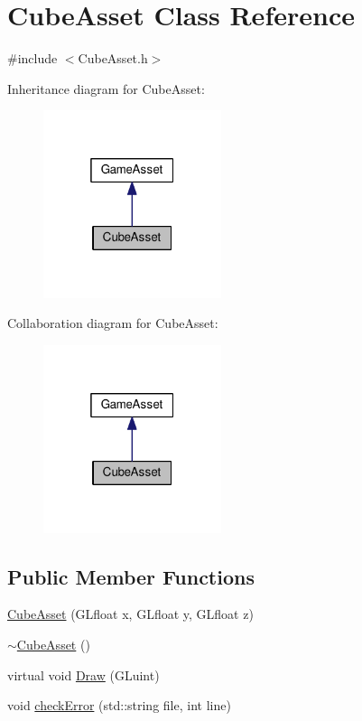 \hypertarget{classCubeAsset}{}\section{Cube\+Asset Class Reference}
\label{classCubeAsset}


{\ttfamily \#include $<$Cube\+Asset.\+h$>$}



Inheritance diagram for Cube\+Asset\+:\nopagebreak
\begin{figure}[H]
\begin{center}
\leavevmode
\includegraphics[width=148pt]{classCubeAsset__inherit__graph}
\end{center}
\end{figure}


Collaboration diagram for Cube\+Asset\+:\nopagebreak
\begin{figure}[H]
\begin{center}
\leavevmode
\includegraphics[width=148pt]{classCubeAsset__coll__graph}
\end{center}
\end{figure}
\subsection*{Public Member Functions}
\begin{DoxyCompactItemize}
\item 
\hyperlink{classCubeAsset_a0252e564114a3cda7e3911ef95742a34}{Cube\+Asset} (G\+Lfloat x, G\+Lfloat y, G\+Lfloat z)
\item 
\hyperlink{classCubeAsset_ab3ab9a5da82cbf8537a28652410093b1}{$\sim$\+Cube\+Asset} ()
\item 
virtual void \hyperlink{classCubeAsset_a1af568486056e254ffcf98fd99947bfe}{Draw} (G\+Luint)
\item 
void \hyperlink{classCubeAsset_ac3855728a8d6c1612ebc85f82d3b535e}{check\+Error} (std\+::string file, int line)
\end{DoxyCompactItemize}


